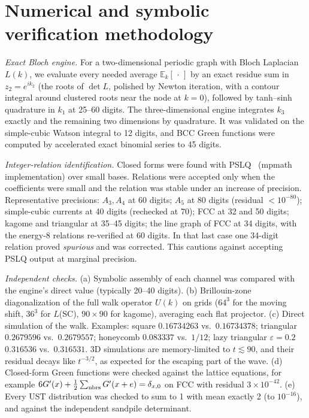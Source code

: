 \documentclass[aps,pra,10pt,twocolumn,superscriptaddress,nofootinbib]{revtex4-2}
\newcommand{\E}{\mathbb{E}}
\begin{document}
\section{Numerical and symbolic verification methodology}
\label{sec:methods}

\emph{Exact Bloch engine.} For a two-dimensional periodic graph with Bloch Laplacian $L(k)$, we
evaluate every needed average $\E_k[\,\cdot\,]$ by an exact residue sum in $z_2=e^{ik_2}$ (the roots
of $\det L$, polished by Newton iteration, with a contour integral around clustered roots near the
node at $k=0$), followed by tanh--sinh quadrature in $k_1$ at 25--60 digits. The three-dimensional
engine integrates $k_3$ exactly and the remaining two dimensions by quadrature. It was validated
on the simple-cubic Watson integral to 12 digits, and BCC Green functions were computed by accelerated
exact binomial series to 45 digits.

\emph{Integer-relation identification.} Closed forms were found with PSLQ~\cite{PSLQ1999} (mpmath
implementation) over small bases. Relations were accepted only when the coefficients were small and
the relation was stable under an increase of precision. Representative precisions: $A_3,A_4$ at 60
digits; $A_5$ at 80 digits (residual $<10^{-80}$); simple-cubic currents at 40 digits (rechecked at
70); FCC at 32 and 50 digits; kagome and triangular at 35--45 digits; the line graph of FCC at 34 digits,
with the energy-8 relations re-verified at 60 digits. In that last case one 34-digit relation proved
\emph{spurious} and was corrected. This cautions against accepting PSLQ output at marginal precision.

\emph{Independent checks.} (a) Symbolic assembly of each channel was compared with the engine's direct
value (typically 20--40 digits). (b) Brillouin-zone diagonalization of the full walk operator $U(k)$ on
grids ($64^3$ for the moving shift, $36^3$ for $L$(SC), $90\times90$ for kagome), averaging each flat
projector. (c) Direct simulation of the walk. Examples: square $0.16734263$ vs.\ $0.16734378$;
triangular $0.2679596$ vs.\ $0.2679557$; honeycomb $0.083337$ vs.\ $1/12$; lazy triangular
$\varepsilon=0.2$ $0.316536$ vs.\ $0.316531$. 3D simulations are memory-limited to $t\lesssim90$, and
their residual decays like $t^{-3/2}$, as expected for the escaping part of the wave. (d) Closed-form
Green functions were checked against the lattice equations, for example
$6G'(x)+\tfrac12\sum_{\rm nbrs}G'(x+e)=\delta_{x,0}$ on FCC with residual $3\times10^{-42}$.
(e) Every UST distribution was checked to sum to 1 with mean exactly 2 (to $10^{-16}$), and against
the independent sandpile determinant.
\end{document}
